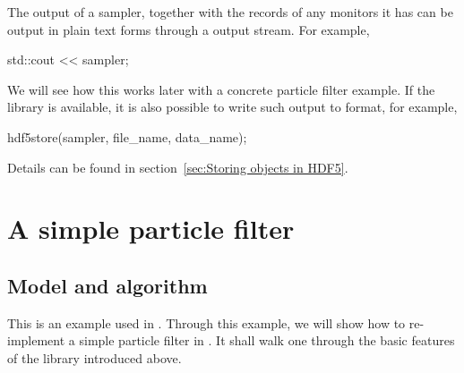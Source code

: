 The output of a sampler, together with the records of any monitors it has can
be output in plain text forms through a \cpp output stream. For example,
\begin{cppcode}
  std::cout << sampler;
\end{cppcode}
We will see how this works later with a concrete particle filter example. If
the \hdf library is available, it is also possible to write such output to \hdf
format, for example,
\begin{cppcode}
  hdf5store(sampler, file_name, data_name);
\end{cppcode}
Details can be found in section~\ref{sec:Storing objects in HDF5}.

\section{A simple particle filter}
\label{sec:A simple particle filter}

\subsection{Model and algorithm}
\label{sub:Model and algorithm}

This is an example used in \textcite{Johansen:2009wd}. Through this example, we
will show how to re-implement a simple particle filter in \vsmc. It shall walk
one through the basic features of the library introduced above.

